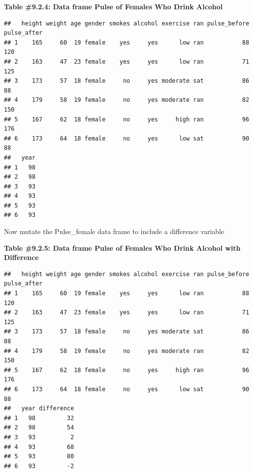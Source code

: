 \documentclass[
]{book}
\newenvironment{Shaded}{\begin{snugshade}}{\end{snugshade}}
\newcommand{\DataTypeTok}[1]{\textcolor[rgb]{0.13,0.29,0.53}{#1}}
\newcommand{\KeywordTok}[1]{\textcolor[rgb]{0.13,0.29,0.53}{\textbf{#1}}}
\newcommand{\NormalTok}[1]{#1}
\newcommand{\OperatorTok}[1]{\textcolor[rgb]{0.81,0.36,0.00}{\textbf{#1}}}
\newcommand{\StringTok}[1]{\textcolor[rgb]{0.31,0.60,0.02}{#1}}
\begin{document}
\textbf{Table \#9.2.4: Data frame Pulse of Females Who Drink Alcohol}

\begin{Shaded}
\end{Shaded}

\begin{verbatim}
##   height weight age gender smokes alcohol exercise ran pulse_before pulse_after
## 1    165     60  19 female    yes     yes      low ran           88         120
## 2    163     47  23 female    yes     yes      low ran           71         125
## 3    173     57  18 female     no     yes moderate sat           86          88
## 4    179     58  19 female     no     yes moderate ran           82         150
## 5    167     62  18 female     no     yes     high ran           96         176
## 6    173     64  18 female     no     yes      low sat           90          88
##   year
## 1   98
## 2   98
## 3   93
## 4   93
## 5   93
## 6   93
\end{verbatim}

Now mutate the Pulse\_female data frame to include a difference variable

\textbf{Table \#9.2.5: Data frame Pulse of Females Who Drink Alcohol with Difference}

\begin{Shaded}
\end{Shaded}

\begin{verbatim}
##   height weight age gender smokes alcohol exercise ran pulse_before pulse_after
## 1    165     60  19 female    yes     yes      low ran           88         120
## 2    163     47  23 female    yes     yes      low ran           71         125
## 3    173     57  18 female     no     yes moderate sat           86          88
## 4    179     58  19 female     no     yes moderate ran           82         150
## 5    167     62  18 female     no     yes     high ran           96         176
## 6    173     64  18 female     no     yes      low sat           90          88
##   year difference
## 1   98         32
## 2   98         54
## 3   93          2
## 4   93         68
## 5   93         80
## 6   93         -2
\end{verbatim}
\end{document}
